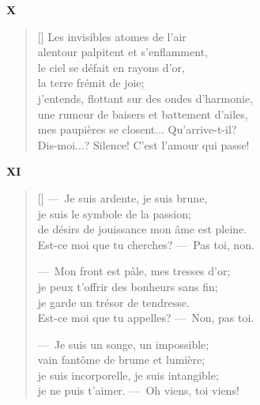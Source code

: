 \documentclass[a4paper,12pt]{book}
\begin{document}
\bigskip

\begin{center}
  \textbf{X}
\end{center}

\settowidth{\versewidth}{Dis-moi...? Silence! C'est l'amour qui passe!}

\begin{verse}[\versewidth]
  Les invisibles atomes de l'air \\
  alentour palpitent et s'enflamment, \\
  le ciel se défait en rayons d'or, \\
  la terre frémit de joie; \\
  j'entends, flottant sur des ondes d'harmonie, \\
  une rumeur de baisers et battement d'ailes, \\
  mes paupières se closent... Qu'arrive-t-il? \\
  Dis-moi...? Silence! C'est l'amour qui passe! %
\end{verse}

\bigskip

\begin{center}
  \textbf{XI}
\end{center}

\settowidth{\versewidth}{de désirs de jouissance mon âme est pleine.}

\begin{verse}[\versewidth]
  ---~Je suis ardente, je suis brune, \\
  je suis le symbole de la passion; \\
  de désirs de jouissance mon âme est pleine. \\
  Est-ce moi que tu cherches? ---~Pas toi, non.

  ---~Mon front est pâle, mes tresses d'or; \\
  je peux t'offrir des bonheurs sans fin; \\
  je garde un trésor de tendresse. \\
  Est-ce moi que tu appelles? ---~Non, pas toi.

  ---~Je suis un songe, un impossible; \\
  vain fantôme de brume et lumière; \\
  je suis incorporelle, je suis intangible; \\
  je ne puis t'aimer. ---~Oh viens, toi viens!
\end{verse}
\end{document}
